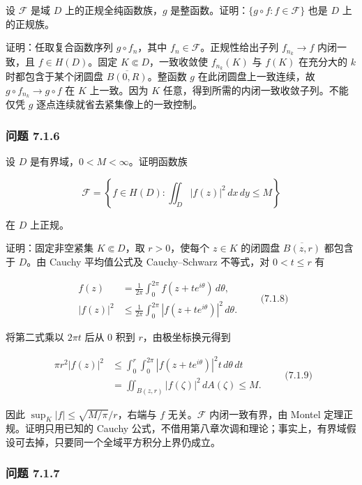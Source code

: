 \documentclass[11pt,a4paper]{article}
\begin{document}
设 \(\mathcal F\) 是域 \(D\) 上的正规全纯函数族，\(g\)
是整函数。证明：\(\{g\circ f:f\in\mathcal F\}\) 也是 \(D\) 上的正规族。

证明：任取复合函数序列 \(g\circ f_n\)，其中
\(f_n\in\mathcal F\)。正规性给出子列 \(f_{n_k}\to f\) 内闭一致，且
\(f\in H(D)\)。固定 \(K\Subset D\)，一致收敛使 \(f_{n_k}(K)\) 与
\(f(K)\) 在充分大的 \(k\) 时都包含于某个闭圆盘
\(\overline{B(0,R)}\)。整函数 \(g\) 在此闭圆盘上一致连续，故
\(g\circ f_{n_k}\to g\circ f\) 在 \(K\) 上一致。因为 \(K\)
任意，得到所需的内闭一致收敛子列。不能仅凭 \(g\)
逐点连续就省去紧集像上的一致控制。

\subsubsection{问题 7.1.6}\label{ch07-s1-ux95eeux9898-716}

设 \(D\) 是有界域，\(0<M<\infty\)。证明函数族

\[
\mathcal F=\left\{f\in H(D):\iint_D|f(z)|^2\,dx\,dy\le M\right\}
\]

在 \(D\) 上正规。

证明：固定非空紧集 \(K\Subset D\)，取 \(r>0\)，使每个 \(z\in K\)
的闭圆盘 \(\overline{B(z,r)}\) 都包含于 \(D\)。由 Cauchy 平均值公式及
Cauchy--Schwarz 不等式，对 \(0<t\le r\) 有

\[
\begin{aligned}
f(z)&=\frac1{2\pi}\int_0^{2\pi}f(z+te^{i\theta})\,d\theta,\\
|f(z)|^2&\le\frac1{2\pi}\int_0^{2\pi}|f(z+te^{i\theta})|^2\,d\theta.
\end{aligned}
\qquad\text{(7.1.8)}
\]

将第二式乘以 \(2\pi t\) 后从 \(0\) 积到 \(r\)，由极坐标换元得到

\[
\begin{aligned}
\pi r^2|f(z)|^2
&\le\int_0^r\int_0^{2\pi}|f(z+te^{i\theta})|^2t\,d\theta\,dt\\
&=\iint_{B(z,r)}|f(\zeta)|^2\,dA(\zeta)\le M.
\end{aligned}
\qquad\text{(7.1.9)}
\]

因此 \(\sup_K|f|\le\sqrt{M/\pi}/r\)，右端与 \(f\) 无关。\(\mathcal F\)
内闭一致有界，由 Montel 定理正规。证明只用已知的 Cauchy
公式，不借用第八章次调和理论；事实上，有界域假设可去掉，只要同一个全域平方积分上界仍成立。

\subsubsection{问题 7.1.7}\label{ch07-s1-ux95eeux9898-717}
\end{document}
